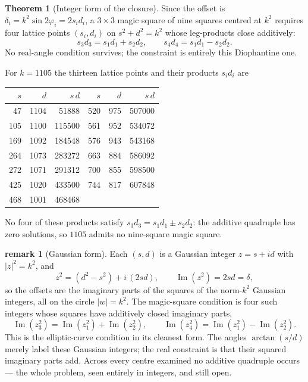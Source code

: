 \documentclass[11pt]{article}
\theoremstyle{definition}
\newtheorem{theorem}{Theorem}
\newtheorem{remark}{remark}
\begin{document}
\begin{theorem}[Integer form of the closure]\label{thm:intclosure}
Since the offset is $\delta_i=k^{2}\sin2\varphi_i=2s_id_i$, a $3\times3$ magic
square of nine squares centred at $k^{2}$ requires four lattice points
$(s_i,d_i)$ on $s^{2}+d^{2}=k^{2}$ whose leg-products close additively:
\[
  s_3d_3=s_1d_1+s_2d_2,\qquad s_4d_4=s_1d_1-s_2d_2.
\]
No real-angle condition survives; the constraint is entirely this Diophantine one.
\end{theorem}

\noindent For $k=1105$ the thirteen lattice points and their products $s_id_i$ are

\begin{center}
\small
\begin{tabular}{rrr@{\qquad}rrr}
\hline
$s$ & $d$ & $s\,d$ & $s$ & $d$ & $s\,d$\\
\hline
 47 & 1104 &  51888 & 520 &  975 & 507000\\
105 & 1100 & 115500 & 561 &  952 & 534072\\
169 & 1092 & 184548 & 576 &  943 & 543168\\
264 & 1073 & 283272 & 663 &  884 & 586092\\
272 & 1071 & 291312 & 700 &  855 & 598500\\
425 & 1020 & 433500 & 744 &  817 & 607848\\
468 & 1001 & 468468 &     &      &       \\
\hline
\end{tabular}
\end{center}

\noindent No four of these products satisfy $s_3d_3=s_1d_1\pm s_2d_2$: the
additive quadruple has zero solutions, so $1105$ admits no nine-square magic
square.

\begin{remark}[Gaussian form]
Each $(s,d)$ is a Gaussian integer $z=s+id$ with $|z|^{2}=k^{2}$, and
\[
  z^{2}=(d^{2}-s^{2})+i\,(2sd),\qquad \operatorname{Im}(z^{2})=2sd=\delta,
\]
so the offsets are the imaginary parts of the squares of the norm-$k^{2}$ Gaussian
integers, all on the circle $|w|=k^{2}$. The magic-square condition is four such
integers whose squares have additively closed imaginary parts,
\[
  \operatorname{Im}(z_3^{2})=\operatorname{Im}(z_1^{2})+\operatorname{Im}(z_2^{2}),
  \qquad
  \operatorname{Im}(z_4^{2})=\operatorname{Im}(z_1^{2})-\operatorname{Im}(z_2^{2}).
\]
This is the elliptic-curve condition in its cleanest form. The angles
$\arctan(s/d)$ merely label these Gaussian integers; the real constraint is that
their squared imaginary parts add. Across every centre examined no additive
quadruple occurs --- the whole problem, seen entirely in integers, and still open.
\end{remark}
\end{document}
